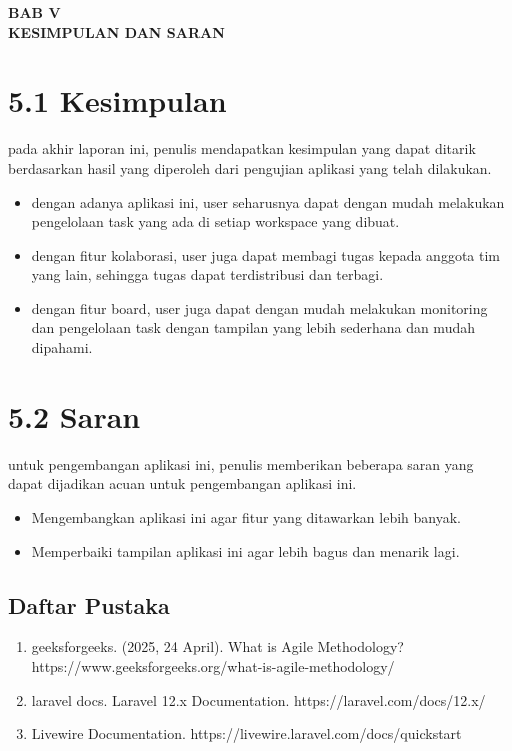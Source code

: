 \begin{center}
  \textbf{BAB V} \\[0.5em]
  \textbf{KESIMPULAN DAN SARAN}
\end{center}

\section*{5.1 Kesimpulan}
pada akhir laporan ini, penulis mendapatkan kesimpulan yang dapat ditarik berdasarkan hasil yang diperoleh dari pengujian aplikasi yang telah dilakukan.
\begin{itemize}
  \item dengan adanya aplikasi ini, user seharusnya dapat dengan mudah melakukan pengelolaan task yang ada di setiap workspace yang dibuat.
  \item dengan fitur kolaborasi, user juga dapat membagi tugas kepada anggota tim yang lain, sehingga tugas dapat terdistribusi dan terbagi.
  \item dengan fitur board, user juga dapat dengan mudah melakukan monitoring dan pengelolaan task dengan tampilan yang lebih sederhana dan mudah dipahami.
\end{itemize}



\section*{5.2 Saran}
untuk pengembangan aplikasi ini, penulis memberikan beberapa saran yang dapat dijadikan acuan untuk pengembangan aplikasi ini.
\begin{itemize}
  \item Mengembangkan aplikasi ini agar fitur yang ditawarkan lebih banyak.
  \item Memperbaiki tampilan aplikasi ini agar lebih bagus dan menarik lagi.
\end{itemize}



\pagebreak
\begin{center}
\section*{Daftar Pustaka}
\begin{enumerate}
  \item geeksforgeeks. (2025, 24 April). What is Agile Methodology? https://www.geeksforgeeks.org/what-is-agile-methodology/ 
  \item laravel docs. Laravel 12.x Documentation. https://laravel.com/docs/12.x/
  \item Livewire Documentation. https://livewire.laravel.com/docs/quickstart
\end{enumerate}
\end{center}

